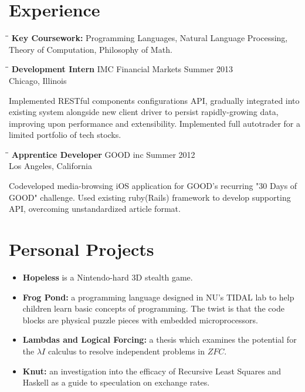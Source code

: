 \documentclass{res}
\begin{document}
\begin{resume}
    \section{Experience}
    \vspace{-0.1in}    
    \begin{tabbing}
    \hspace{2.3in}\= \hspace{2.6in}\= \kill %
{\bf Key Coursework:} Programming Languages, Natural Language Processing, Theory of Computation, Philosophy of Math.
\end{tabbing}\vspace{-20pt}      %
\begin{tabbing}
\hspace{2.3in}\= \hspace{2.6in}\= \kill %
{\bf Development Intern} \>IMC Financial Markets \>Summer 2013\\
    \>Chicago, Illinois
    \end{tabbing}\vspace{-20pt}      %
    Implemented RESTful components configurations API, gradually integrated into existing system alongside new client driver to persist rapidly-growing data, improving upon performance and extensibility. Implemented full autotrader for a limited portfolio of tech stocks.
    \begin{tabbing}
    \hspace{2.3in}\= \hspace{2.6in}\= \kill %
{\bf Apprentice Developer} \>GOOD inc               \>Summer 2012\\
    \>Los Angeles, California
    \end{tabbing}\vspace{-20pt}
    Codeveloped media-browsing iOS application for GOOD's recurring "30 Days of GOOD" challenge. Used existing ruby(Rails) framework to develop supporting API, overcoming unstandardized article format.

    \section{Personal Projects}
    \begin{itemize}
    \item {\bf Hopeless} is a Nintendo-hard 3D stealth game.
    \item {\bf Frog Pond:} a programming language designed in NU's TIDAL lab to help children learn basic concepts of programming. The twist is that the code blocks are physical puzzle pieces with embedded microprocessors.
    \item {\bf Lambdas and Logical Forcing:} a thesis which examines the potential for the $\lambda I$ calculus to resolve independent problems in $ZFC$.
    \item {\bf Knut:} an investigation into the efficacy of Recursive Least Squares and Haskell as a guide to speculation on exchange rates.
    \end{itemize}


\end{resume}
\end{document}
